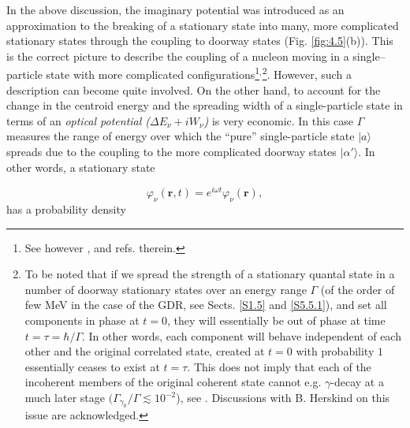 In the above discussion, the imaginary potential was introduced as an approximation to  the breaking of a stationary state into many, more complicated stationary states through the coupling to doorway states (Fig. \ref{fig:4.5}(b)). This is the  correct picture to describe the coupling of a nucleon moving in a single--particle state with more complicated configurations\footnote{See however \cite{Caldeira:81}, \cite{Caldeira:83} and refs. therein.}$^,$\footnote{To be noted that if we spread the strength of a stationary quantal state in a number of doorway stationary states over an energy range $\Gamma$ (of the order of few MeV in the case of the GDR, see Sects. \ref{S1.5} and \ref{S5.5.1}), and set all components in phase at $t=0$, they will essentially be out of phase at time $t=\tau = \hbar/\Gamma$. In other words, each component will behave independent of each other and the original correlated state, created at $t=0$ with probability $1$ essentially ceases to exist at $t=\tau$. This does not imply that each of the incoherent members of the original coherent state cannot e.g. $\gamma$-decay at a much later stage $(\Gamma_{\gamma_0}/\Gamma\lesssim10^{-2}$), see \cite{Bortignon:98}. Discussions with B. Herskind on this issue are acknowledged.}. However, such a description can become quite involved. On the other hand, to account for the change in the centroid energy and the spreading width of a single-particle state in terms of an {\it optical potential ($\Delta E_\nu + iW_\nu$)}  is very economic. In this case $\Gamma$ measures the range of energy over which the ``pure'' single-particle state $|a\rangle$ spreads due to the coupling to the more complicated doorway states $|\alpha'\rangle$. In other words, a stationary state

\begin{equation}
\varphi_{\nu}(\mathbf r,t) = e^{i\omega t} \varphi_{\nu}(\mathbf r) ,
\label{eqn:43}
\end{equation}
has a probability density

